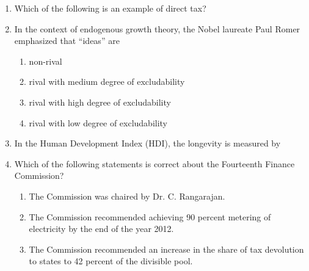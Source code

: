 \documentclass[12pt]{article}
\theoremstyle{remark}
\begin{document}
\begin{enumerate}
\begin{enumerate}
 \end{enumerate}
\hfill{}
\item Which of the following is an example of direct tax? 
\begin{enumerate}  \end{enumerate}
\hfill{}
\item In the context of endogenous growth theory, the Nobel laureate Paul Romer emphasized that “ideas” are 
\begin{enumerate} 
\item  non-rival 
\item  rival with medium degree of excludability
\item  rival with high degree of excludability
\item  rival with low degree of excludability 
\end{enumerate}
\hfill{}
\item  In the Human Development Index (HDI), the longevity is measured by 
\begin{enumerate}  \end{enumerate}
\hfill{}
\item  Which of the following statements is correct about the Fourteenth Finance Commission? 
\begin{enumerate} 
\item  The Commission was chaired by Dr. C. Rangarajan. 
\item  The Commission recommended achieving 90 percent metering of electricity by the end of the year 2012. 
\item  The Commission recommended an increase in the share of tax devolution to states to 42 percent of the divisible pool. 

\end{enumerate}
\end{enumerate}
\end{document}

